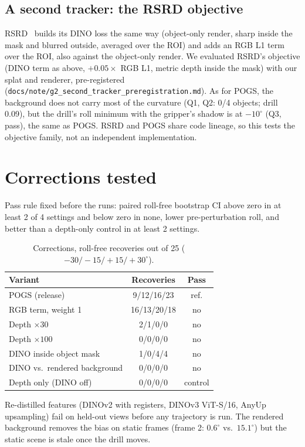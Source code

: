 \documentclass[conference]{IEEEtran}
\begin{document}
\subsection{A second tracker: the RSRD objective}\label{sec:g2}
RSRD~\cite{kerr2024rsrd} builds its DINO loss the same way (object-only render, sharp inside the mask and blurred
outside, averaged over the ROI) and adds an RGB L1 term over the ROI, also against the object-only render.
We evaluated RSRD's objective (DINO term as above, $+0.05\times$ RGB L1, metric depth inside the mask) with our splat
and renderer, pre-registered (\nolinkurl{docs/note/g2_second_tracker_preregistration.md}). As for POGS, the background
does not carry most of the curvature (Q1, Q2: 0/4 objects; drill 0.09), but the drill's roll minimum with the
gripper's shadow is at $-10^\circ$ (Q3, pass), the same as POGS. RSRD and POGS share code lineage, so this tests the objective family, not an
independent implementation.

\section{Corrections tested}\label{sec:fixes}
Pass rule fixed before the runs: paired roll-free bootstrap CI above zero in at least 2 of 4 settings and below zero
in none, lower pre-perturbation roll, and better than a depth-only control in at least 2 settings.
\begin{table}[t]\centering\caption{Corrections, roll-free recoveries out of 25 ($-30/-15/+15/+30^\circ$).}\label{tab:fixes}
\begin{tabular}{lcc}\toprule Variant & Recoveries & Pass\\\midrule
POGS (release) & 9/12/16/23 & ref.\\
RGB term, weight 1 & 16/13/20/18 & no\\
Depth $\times30$ & 2/1/0/0 & no\\ Depth $\times100$ & 0/0/0/0 & no\\
DINO inside object mask & 1/0/4/4 & no\\ DINO vs.\ rendered background & 0/0/0/0 & no\\
Depth only (DINO off) & 0/0/0/0 & control\\\bottomrule\end{tabular}\end{table}
Re-distilled features (DINOv2 with registers, DINOv3 ViT-S/16, AnyUp upsampling) fail on held-out views before
any trajectory is run. The rendered background removes the bias on static frames (frame 2: $0.6^\circ$ vs.\ $15.1^\circ$)
but the static scene is stale once the drill moves.
\end{document}
